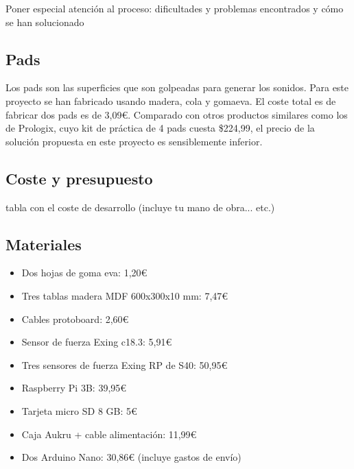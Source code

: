 \documentclass{article}
\begin{document}
    Poner especial atención al proceso: dificultades y problemas encontrados y cómo se han solucionado

        \subsection{Pads} %
        \label{sub:Pads}

            Los pads son las superficies que son golpeadas para generar los sonidos. Para este proyecto se han fabricado
            usando madera, cola y gomaeva\cite{GomaEva}. El coste total es de fabricar dos pads es de 3,09\euro{}.
            Comparado con otros productos similares como los de Prologix\cite{practice_pad}, cuyo kit de práctica de 4
            pads cuesta \$224,99, el precio de la solución propuesta en este proyecto es sensiblemente inferior.


        \subsection{Coste y presupuesto} %
        \label{sub:CosteYPresupuesto}

            tabla con el coste de desarrollo (incluye tu mano de obra... etc.)


        \subsection{Materiales} %
        \label{sub:Materiales}

            \begin{itemize}
                \item Dos hojas de goma eva: 1,20\euro{}
                \item Tres tablas madera MDF 600x300x10 mm: 7,47\euro{}
                \item Cables protoboard: 2,60\euro{}
                \item Sensor de fuerza Exing c18.3: 5,91\euro{}
                \item Tres sensores de fuerza Exing RP de S40: 50,95\euro{}
                \item Raspberry Pi 3B: 39,95\euro{}
                \item Tarjeta micro SD 8 GB: 5\euro{}
                \item Caja Aukru + cable alimentación: 11,99\euro{}
                \item Dos Arduino Nano: 30,86\euro{} (incluye gastos de envío)
            \end{itemize}
\end{document}
